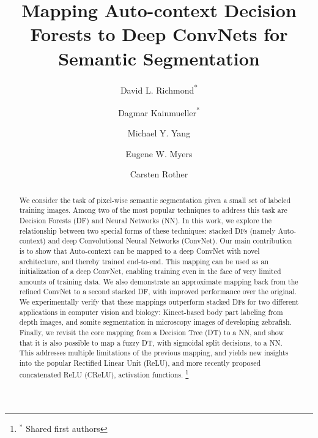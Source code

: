 \documentclass[twocolumn]{svjour3}
\newcommand\blfootnote[1]{%
  \begingroup
  \renewcommand\thefootnote{}\footnote{#1}%
  \addtocounter{footnote}{-1}%
  \endgroup
}
\begin{document}
\title{Mapping Auto-context Decision Forests to Deep ConvNets for Semantic Segmentation}


\author{David L. Richmond\textsuperscript{*} \and
	    Dagmar Kainmueller\textsuperscript{*} \and
		Michael Y. Yang \and
		Eugene W. Myers \and
		Carsten Rother
}



\date{}

\maketitle

\begin{abstract}
We consider the task of pixel-wise semantic segmentation given a small set of labeled training images.
Among two of the most popular techniques to address this task are Decision Forests (DF) and Neural Networks (NN).
In this work, we explore the relationship between two special forms of these techniques: stacked DFs (namely Auto-context) and deep Convolutional Neural Networks (ConvNet).
Our main contribution is to show that Auto-context can be mapped to a deep ConvNet with novel architecture, and thereby trained end-to-end.
This mapping can be used as an initialization of a deep ConvNet, enabling training even in the face of very limited amounts of training data.
We also demonstrate an approximate mapping back from the refined ConvNet to a second stacked DF, with improved performance over the original.
We experimentally verify that these mappings outperform stacked DFs for two different applications in computer vision and biology:  Kinect-based body part labeling from depth images, and somite segmentation in microscopy images of developing zebrafish.
%
Finally, we revisit the core mapping from a Decision Tree (DT) to a NN, and show that it is also possible to map a fuzzy DT, with sigmoidal split decisions, to a NN.
This addresses multiple limitations of the previous mapping, and yields new insights into the popular Rectified Linear Unit (ReLU), and more recently proposed concatenated ReLU (CReLU), activation functions.
\blfootnote{$^*$ Shared first authors}
\end{abstract}
\end{document}
